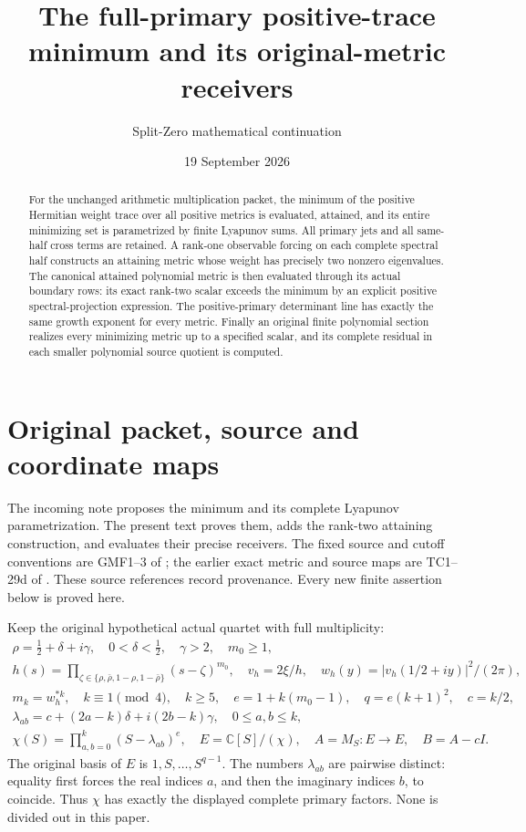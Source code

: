 \documentclass[11pt]{article}
\title{The full-primary positive-trace minimum and its original-metric receivers}
\author{Split-Zero mathematical continuation}
\date{19 September 2026}
\newcommand{\C}{\mathbb C}
\begin{document}
\maketitle

\begin{abstract}
For the unchanged arithmetic multiplication packet, the minimum of the
positive Hermitian weight trace over all positive metrics is evaluated,
attained, and its entire minimizing set is parametrized by finite
Lyapunov sums. All primary jets and all same-half cross terms are
retained. A rank-one observable forcing on each complete spectral half
constructs an attaining metric whose weight has precisely two nonzero
eigenvalues. The canonical attained polynomial metric is then evaluated
through its actual boundary rows: its exact rank-two scalar exceeds the
minimum by an explicit positive spectral-projection expression. The
positive-primary determinant line has exactly the same growth exponent
for every metric. Finally an original finite polynomial section realizes
every minimizing metric up to a specified scalar, and its complete
residual in each smaller polynomial source quotient is computed.
\end{abstract}

\section{Original packet, source and coordinate maps}

The incoming note \cite{incoming} proposes the minimum and its complete
Lyapunov parametrization. The present text proves them, adds the
rank-two attaining construction, and evaluates their precise receivers.
The fixed source and cutoff conventions are GMF1--3 of
\cite{gmf}; the earlier exact metric and source maps are TC1--29d of
\cite{tc}. These source references record provenance. Every new finite
assertion below is proved here.

Keep the original hypothetical actual quartet with full multiplicity:
\begin{equation}\tag{PT1}
\begin{gathered}
 \rho=\tfrac12+\delta+i\gamma,\quad
 0<\delta<\tfrac12,\quad\gamma>2,\quad m_0\ge1,\\
 h(s)=\prod_{\zeta\in\{\rho,\bar\rho,1-\rho,1-\bar\rho\}}
                     (s-\zeta)^{m_0},\quad
 v_h=2\xi/h,\quad w_h(y)=|v_h(1/2+iy)|^2/(2\pi),\\
 m_k=w_h^{*k},\quad k\equiv1\pmod4,\quad k\ge5,\quad
 e=1+k(m_0-1),\quad q=e(k+1)^2,\quad c=k/2,\\
 \lambda_{ab}=c+(2a-k)\delta+i(2b-k)\gamma,\quad0\le a,b\le k,\\
 \chi(S)=\prod_{a,b=0}^k(S-\lambda_{ab})^e,\quad
 E=\C[S]/(\chi),\quad A=M_S:E\to E,\quad B=A-cI.
\end{gathered}
\end{equation}
The original basis of \(E\) is \(1,S,\ldots,S^{q-1}\).
The numbers \(\lambda_{ab}\) are pairwise distinct: equality first
forces the real indices \(a\), and then the imaginary indices \(b\),
to coincide. Thus \(\chi\) has exactly the displayed complete primary
factors. None is divided out in this paper.
\end{document}

